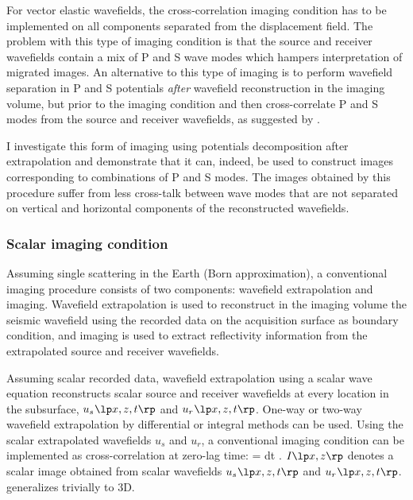 
For vector elastic wavefields, the cross-correlation imaging condition has to be implemented on all components separated from the displacement field. The problem with this type of imaging condition is that the source and receiver wavefields contain a mix of P and S wave modes which hampers interpretation of migrated images. An alternative to this type of imaging is to perform wavefield separation in P and S potentials \emph{after} wavefield reconstruction in the imaging volume, but prior to the imaging condition and then cross-correlate P and S modes from the source and receiver wavefields, as suggested by \cite{GEO55-07-09140919}.

I investigate this form of imaging using potentials decomposition after extrapolation and demonstrate that it can, indeed, be used to construct images corresponding to combinations of P and S modes. The images obtained by this procedure suffer from less  cross-talk between wave modes that are not separated on vertical and horizontal components of the reconstructed wavefields.
\subsubsection{Scalar imaging condition}
Assuming single scattering in the Earth (Born approximation), a conventional imaging procedure consists of two components: wavefield extrapolation and imaging. Wavefield extrapolation is used to reconstruct in the imaging volume the seismic wavefield using the recorded data on the acquisition surface as boundary condition, and imaging is used to extract reflectivity information from the extrapolated source and receiver wavefields.

Assuming scalar recorded data, wavefield extrapolation using a scalar wave equation reconstructs scalar source and receiver wavefields at every location in the subsurface, $\US{}$ and $\UR{}$. One-way or two-way wavefield extrapolation by differential or integral methods can be used. Using the scalar extrapolated wavefields $u_s$ and $u_r$, a conventional imaging condition \cite[]{Claerbout.iei} can be implemented as cross-correlation at zero-lag time: 
\beq \label{eqn:CIC}
\IM{} = \int \US{} \UR{} dt \;.
\eeq
$\IM{}$ denotes a scalar image obtained from scalar wavefields $\US{}$ and $\UR{}$.  generalizes trivially to 3D.

